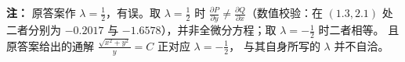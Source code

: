 \begin{enumerate}
{\begin{enumerate}
	\par\vspace{1mm}\noindent
	\textbf{注：}{\kaishu
	原答案作 $\lambda=\frac12$，有误。取 $\lambda=\frac12$ 时
	$\frac{\partial P}{\partial y}\neq\frac{\partial Q}{\partial x}$（数值校验：在 $(1.3,2.1)$ 处二者分别为
	$-0.2017$ 与 $-1.6578$），并非全微分方程；取 $\lambda=-\frac12$ 时二者相等。
	且原答案给出的通解 $\frac{\sqrt{x^{2}+y^{2}}}{y}=C$ 正对应 $\lambda=-\frac12$，
	与其自身所写的 $\lambda$ 并不自洽。
	}\par
\end{enumerate}
}


	
\end{enumerate}



